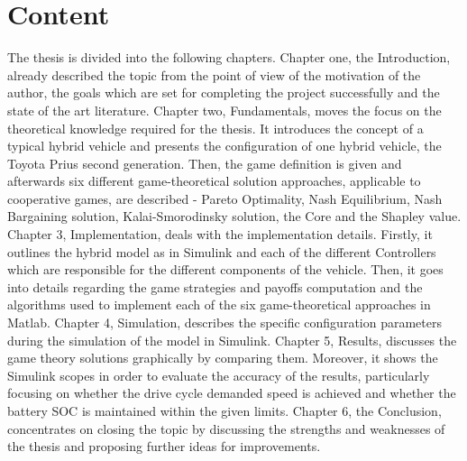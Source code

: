 \section{Content}
The thesis is divided into the following chapters. Chapter one, the Introduction, already described the topic from the point of view of the motivation of the author, the goals which are set for completing the project successfully and the state of the art literature. Chapter two, Fundamentals, moves the focus on the theoretical knowledge required for the thesis. It introduces the concept of a typical hybrid vehicle and presents the configuration of one hybrid vehicle, the Toyota Prius second generation. Then, the game definition is given and afterwards six different game-theoretical solution approaches, applicable to cooperative games, are described - Pareto Optimality, Nash Equilibrium, Nash Bargaining solution, Kalai-Smorodinsky solution, the Core and the Shapley value. Chapter 3, Implementation, deals with the implementation details. Firstly, it outlines the hybrid model as in Simulink and each of the different Controllers which are responsible for the different components of the vehicle. Then, it goes into details regarding the game strategies and payoffs computation and the algorithms used to implement each of the six game-theoretical approaches in Matlab. Chapter 4, Simulation, describes the specific configuration parameters during the simulation of the model in Simulink. Chapter 5, Results, discusses the game theory solutions graphically by comparing them. Moreover, it shows the Simulink scopes in order to evaluate the accuracy of the results, particularly focusing on whether the drive cycle demanded speed is achieved and whether the battery SOC is maintained within the given limits. Chapter 6, the Conclusion, concentrates on closing the topic by discussing the strengths and weaknesses of the thesis and proposing further ideas for improvements.